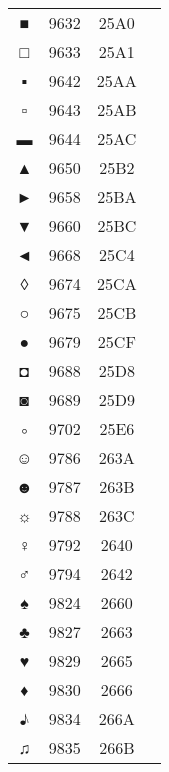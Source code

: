 \documentclass[10pt]{article}
\begin{document}
\begin{tabular}{crcl}
■&9632&25A0&\\
□&9633&25A1&\\
▪&9642&25AA&\\
▫&9643&25AB&\\
▬&9644&25AC&\\
▲&9650&25B2&\\
►&9658&25BA&\\
▼&9660&25BC&\\
◄&9668&25C4&\\
◊&9674&25CA&\\
○&9675&25CB&\\
●&9679&25CF&\\
◘&9688&25D8&\\
◙&9689&25D9&\\
◦&9702&25E6&\\
☺&9786&263A&\\
☻&9787&263B&\\
☼&9788&263C&\\
♀&9792&2640&\\
♂&9794&2642&\\
♠&9824&2660&\\
♣&9827&2663&\\
♥&9829&2665&\\
♦&9830&2666&\\
♪&9834&266A&\\
♫&9835&266B&\\
\end{tabular}
\end{document}
